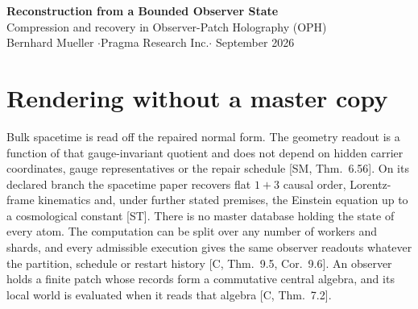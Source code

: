 \documentclass[11pt]{article}
\newcommand{\cit}[1]{[#1]}
\begin{document}
\begin{center}
{\LARGE\bfseries Reconstruction from a Bounded Observer State}\\[0.7ex]
{\normalsize Compression and recovery in Observer-Patch Holography (OPH)}\\[0.9ex]
{\small Bernhard Mueller \quad$\cdot$\quad Pragma Research Inc.\quad$\cdot$ September 2026}
\end{center}
\vspace{-1.5ex}

\begin{abstract}
\noindent In OPH no global computer renders 3D particle coordinates frame by frame.
What we perceive as three-dimensional space, fields and time moving forward are
observer-facing readouts of a computed quotient normal form on a holographic screen.
The substrate has no background clock, no 3D space and no master copy of the world. It
has a finite network of observer patches, a mismatch score on every shared boundary
seam and a local repair move that lowers those scores, and each repair move is a
quantum recovery channel. A bounded observer therefore needs no copy of the world
beyond its boundary. This note makes that quantitative: the relational information
that can be removed from an observer's representation is measured by the conditional
mutual information across its boundary collar, which bounds the best reconstruction
error from above and below.
\end{abstract}

\section{Rendering without a master copy}

Bulk spacetime is read off the repaired normal form. The geometry readout is a
function of that gauge-invariant quotient and does not depend on hidden carrier
coordinates, gauge representatives or the repair schedule \cit{SM, Thm.~6.56}. On its
declared branch the spacetime paper recovers flat $1{+}3$ causal order, Lorentz-frame
kinematics and, under further stated premises, the Einstein equation up to a
cosmological constant \cit{ST}. There is no master database holding the state of
every atom. The computation can be split over any number of workers and shards, and
every admissible execution gives the same observer readouts whatever the partition,
schedule or restart history \cit{C, Thm.~9.5, Cor.~9.6}. An observer holds a finite
patch whose records form a commutative central algebra, and its local world is
evaluated when it reads that algebra \cit{C, Thm.~7.2}.
\end{document}
